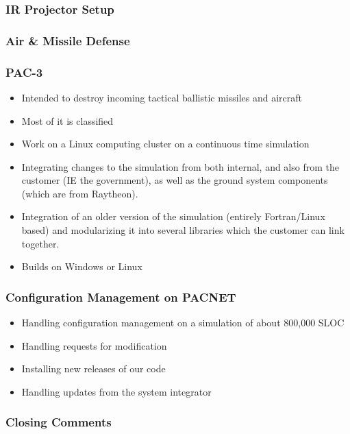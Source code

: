 \documentclass[aspectratio=169]{beamer}
\begin{document}
\begin{frame}
  \frametitle{IR Projector Setup}
\end{frame}

\subsubsection{Air \& Missile Defense}

\begin{frame}
  \frametitle{PAC-3} %
  \begin{itemize}
  \item Intended to destroy incoming tactical ballistic missiles and aircraft
  \item Most of it is classified
  \item Work on a Linux computing cluster on a continuous time simulation
  \item Integrating changes to the simulation from both internal, and also from the customer (IE the government), as well as the ground system components (which are from Raytheon).
  \item Integration of an older version of the simulation (entirely Fortran/Linux based) and modularizing it into several libraries which the customer can link together.
  \item Builds on Windows or Linux
  \end{itemize}
\end{frame}


\begin{frame}
  \frametitle{Configuration Management on PACNET}
  \begin{itemize}
  \item Handling configuration management on a simulation of about 800,000 SLOC
  \item Handling requests for modification
  \item Installing new releases of our code
  \item Handling updates from the system integrator
  \end{itemize}
\end{frame}

\begin{frame}
  \frametitle{Closing Comments}

\end{frame}
\end{document}
